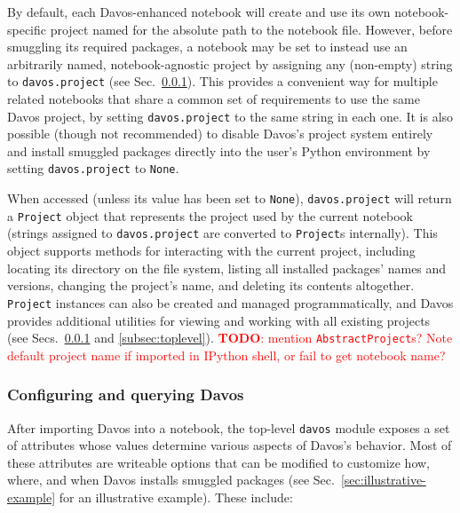 \documentclass[preprint,12pt,a4paper]{elsarticle}
\begin{document}
By default, each Davos-enhanced notebook will create and use its own notebook-specific project named for the absolute path to the notebook file.
However, before smuggling its required packages, a notebook may be set to instead use an arbitrarily named, notebook-agnostic project by assigning any (non-empty) string to \texttt{davos.project} (see Sec.~\ref{subsec:config}).
This provides a convenient way for multiple related notebooks that share a common set of requirements to use the same Davos project, by setting \texttt{davos.project} to the same string in each one.
It is also possible (though not recommended) to disable Davos's project system entirely and install smuggled packages directly into the user's Python environment by setting \texttt{davos.project} to \texttt{None}.

When accessed (unless its value has been set to \texttt{None}), \texttt{davos.project} will return a \texttt{Project} object that represents the project used by the current notebook (strings assigned to \texttt{davos.project} are converted to \texttt{Project}s internally). This object supports methods for interacting with the current project, including locating its directory on the file system, listing all installed packages' names and versions, changing the project's name, and deleting its contents altogether.
\texttt{Project} instances can also be created and managed programmatically, and Davos provides additional utilities for viewing and working with all existing projects (see Secs.~\ref{subsec:config} and \ref{subsec:toplevel}).
\textcolor{red}{\textbf{TODO}: mention \texttt{AbstractProject}s? Note default project name if imported in IPython shell, or fail to get notebook name?}



\subsubsection{Configuring and querying Davos}\label{subsec:config}

After importing Davos into a notebook, the top-level \texttt{davos} module exposes a set of attributes whose values determine various aspects of Davos's behavior. Most of these attributes are writeable options that can be modified to customize how, where, and when Davos installs smuggled packages (see Sec.~\ref{sec:illustrative-example} for an illustrative example). These include:
\end{document}
